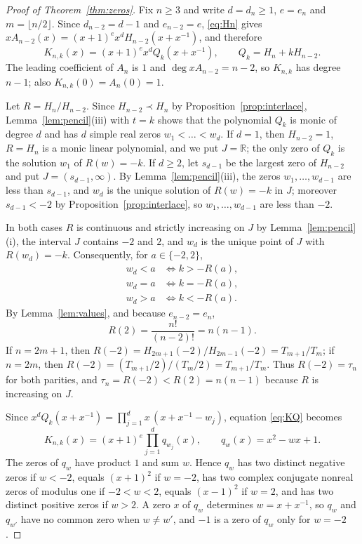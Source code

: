 \documentclass{amsart}
\theoremstyle{remark}
\numberwithin{equation}{section}
\newcommand{\RR}{\mathbb{R}}
\begin{document}
\begin{proof}[Proof of Theorem~\ref{thm:zeros}]
Fix $n\ge 3$ and write $d=d_n\ge 1$, $e=e_n$ and $m=\lfloor n/2\rfloor$.
Since $d_{n-2}=d-1$ and $e_{n-2}=e$, \eqref{eq:Hn} gives
$xA_{n-2}(x)=(x+1)^ex^dH_{n-2}(x+x^{-1})$, and therefore
\begin{equation}\label{eq:KQ}
K_{n,k}(x)=(x+1)^ex^dQ_k(x+x^{-1}),\qquad Q_k=H_n+kH_{n-2}.
\end{equation}
The leading coefficient of $A_n$ is $1$ and $\deg xA_{n-2}=n-2$, so
$K_{n,k}$ has degree $n-1$; also $K_{n,k}(0)=A_n(0)=1$.

Let $R=H_n/H_{n-2}$. Since $H_{n-2}\prec H_n$ by
Proposition~\ref{prop:interlace}, Lemma~\ref{lem:pencil}(iii) with $t=k$
shows that the polynomial $Q_k$ is monic of degree $d$ and has $d$ simple real zeros
$w_1<\dots<w_d$. If $d=1$, then $H_{n-2}=1$, $R=H_n$ is a monic linear
polynomial, and we put $J=\RR$; the only zero of $Q_k$ is the solution $w_1$
of $R(w)=-k$. If $d\ge 2$, let $s_{d-1}$ be the largest zero of $H_{n-2}$ and
put $J=(s_{d-1},\infty)$. By Lemma~\ref{lem:pencil}(iii), the zeros
$w_1,\dots,w_{d-1}$ are less than $s_{d-1}$, and $w_d$ is the unique solution
of $R(w)=-k$ in $J$; moreover $s_{d-1}<-2$ by
Proposition~\ref{prop:interlace}, so $w_1,\dots,w_{d-1}$ are less than $-2$.

In both cases $R$ is continuous and strictly increasing on $J$ by
Lemma~\ref{lem:pencil}(i), the interval $J$ contains $-2$ and $2$, and $w_d$
is the unique point of $J$ with $R(w_d)=-k$. Consequently, for
$a\in\{-2,2\}$,
\begin{equation}\label{eq:compare}
\begin{aligned}
w_d<a&\iff k>-R(a),\\
w_d=a&\iff k=-R(a),\\
w_d>a&\iff k<-R(a).
\end{aligned}
\end{equation}
By Lemma~\ref{lem:values}, and because $e_{n-2}=e_n$,
\[
R(2)=\frac{n!}{(n-2)!}=n(n-1).
\]
If $n=2m+1$, then $R(-2)=H_{2m+1}(-2)/H_{2m-1}(-2)=T_{m+1}/T_m$; if $n=2m$,
then $R(-2)=(T_{m+1}/2)/(T_m/2)=T_{m+1}/T_m$. Thus $R(-2)=\tau_n$ for both
parities, and $\tau_n=R(-2)<R(2)=n(n-1)$ because $R$ is increasing on $J$.

Since $x^dQ_k(x+x^{-1})=\prod_{j=1}^{d}x\,(x+x^{-1}-w_j)$, equation
\eqref{eq:KQ} becomes
\begin{equation}\label{eq:factor}
K_{n,k}(x)=(x+1)^e\prod_{j=1}^{d}q_{w_j}(x),\qquad q_w(x)=x^2-wx+1.
\end{equation}
The zeros of $q_w$ have product $1$ and sum $w$. Hence $q_w$ has two distinct
negative zeros if $w<-2$, equals $(x+1)^2$ if $w=-2$, has two complex
conjugate nonreal zeros of modulus one if $-2<w<2$, equals $(x-1)^2$ if
$w=2$, and has two distinct positive zeros if $w>2$. A zero $x$ of $q_w$
determines $w=x+x^{-1}$, so $q_w$ and $q_{w'}$ have no common zero when
$w\ne w'$, and $-1$ is a zero of $q_w$ only for $w=-2$.


\end{proof}
\end{document}
